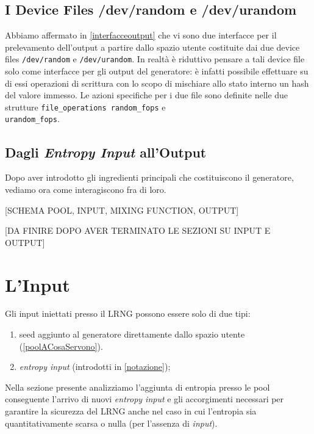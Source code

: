\documentclass{article}
\begin{document}
\subsection{I Device Files /dev/random e /dev/urandom}\label{devicefiles}
Abbiamo affermato in \ref{interfacceoutput} che vi sono due interfacce per il
prelevamento dell'output a partire dallo spazio utente costituite dai due
device files \verb+/dev/random+ e \verb+/dev/urandom+. In realtà è riduttivo
pensare a tali device file solo come interfacce per gli output del generatore: è
infatti possibile effettuare su di essi operazioni di scrittura con lo
scopo di mischiare allo stato interno un hash del valore immesso. 
\newline Le azioni specifiche per i due file sono definite nelle due
strutture \verb+file_operations random_fops+ e \\\verb+urandom_fops+.

\subsection{Dagli \emph{Entropy Input} all'Output}
Dopo aver introdotto gli ingredienti principali che costituiscono il generatore,
vediamo ora come interagiscono fra di loro.

[SCHEMA POOL, INPUT, MIXING FUNCTION, OUTPUT]

[DA FINIRE DOPO AVER TERMINATO LE SEZIONI SU INPUT E OUTPUT] 
  
 \section{L'Input}
 Gli input iniettati presso il LRNG possono essere solo di due tipi:
\begin{enumerate}
  \item seed aggiunto al generatore direttamente dallo spazio utente
  (\ref{poolACosaServono}).
  \item \emph{entropy input} (introdotti in \ref{notazione});
\end{enumerate}
 Nella sezione presente analizziamo l'aggiunta di entropia presso le pool
 conseguente l'arrivo di nuovi \emph{entropy input} e gli accorgimenti necessari
 per garantire la sicurezza del LRNG anche nel caso in cui l'entropia sia
 quantitativamente scarsa o nulla (per l'assenza di \emph{input}).
 
\end{document}
